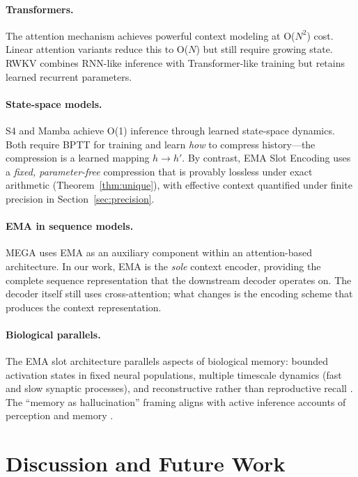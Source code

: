 \documentclass[11pt]{article}
\begin{document}
\paragraph{Transformers.}
The attention mechanism \cite{vaswani2017} achieves powerful context modeling at O($N^2$) cost. Linear attention variants \cite{katharopoulos2020} reduce this to O($N$) but still require growing state. RWKV \cite{peng2023} combines RNN-like inference with Transformer-like training but retains learned recurrent parameters.

\paragraph{State-space models.}
S4 \cite{gu2022} and Mamba \cite{gu2023} achieve O(1) inference through learned state-space dynamics. Both require BPTT for training and learn \emph{how} to compress history---the compression is a learned mapping $h \to h'$. By contrast, EMA Slot Encoding uses a \emph{fixed, parameter-free} compression that is provably lossless under exact arithmetic (Theorem~\ref{thm:unique}), with effective context quantified under finite precision in Section~\ref{sec:precision}.

\paragraph{EMA in sequence models.}
MEGA \cite{ma2023} uses EMA as an auxiliary component within an attention-based architecture. In our work, EMA is the \emph{sole} context encoder, providing the complete sequence representation that the downstream decoder operates on. The decoder itself still uses cross-attention; what changes is the encoding scheme that produces the context representation.

\paragraph{Biological parallels.}
The EMA slot architecture parallels aspects of biological memory: bounded activation states in fixed neural populations, multiple timescale dynamics (fast and slow synaptic processes), and reconstructive rather than reproductive recall \cite{bartlett1932}. The ``memory as hallucination'' framing aligns with active inference accounts of perception and memory \cite{friston2010}.

\section{Discussion and Future Work}
\label{sec:future}
\end{document}
